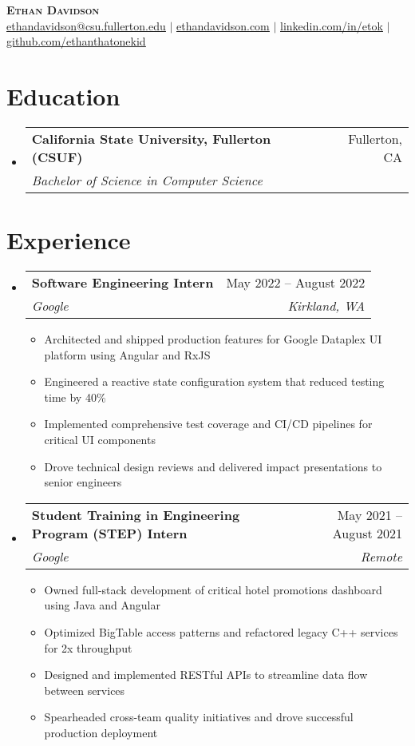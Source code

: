 \documentclass[letterpaper,12pt]{article}
\makeatletter
\newcommand{\resumeItem}[1]{
  \item\small{
    {#1 \vspace{-2pt}}
  }
}
\newcommand{\resumeSubheading}[4]{
  \vspace{-2pt}\item
    \begin{tabular*}{0.97\textwidth}[t]{l@{\extracolsep{\fill}}r}
      \textbf{#1} & #2 \\
      \textit{\small#3} & \textit{\small #4} \\
    \end{tabular*}\vspace{-7pt}
}
\newcommand{\resumeSubHeadingListStart}{\begin{itemize}[leftmargin=0.15in, label={}]}
\newcommand{\resumeSubHeadingListEnd}{\end{itemize}}
\newcommand{\resumeItemListStart}{\begin{itemize}}
\newcommand{\resumeItemListEnd}{\end{itemize}\vspace{-5pt}}
\makeatother
\begin{document}
\begin{center}
  \textbf{\Huge \scshape Ethan Davidson} \\ \vspace{1pt}
  \small \href{mailto:ethandavidson@csu.fullerton.edu}{\underline{ethandavidson@csu.fullerton.edu}} $|$ 
  \href{https://etok.me}{\underline{ethandavidson.com}} $|$
  \href{https://linkedin.com/in/etok}{\underline{linkedin.com/in/etok}} $|$
  \href{https://github.com/ethanthatonekid}{\underline{github.com/ethanthatonekid}}
\end{center}

\section{Education}
\resumeSubHeadingListStart
  \resumeSubheading
    {California State University, Fullerton (CSUF)}{Fullerton, CA}
    {Bachelor of Science in Computer Science}{}
\resumeSubHeadingListEnd

\section{Experience}
\resumeSubHeadingListStart
  \resumeSubheading
    {Software Engineering Intern}{May 2022 -- August 2022}
    {Google}{Kirkland, WA}
    \resumeItemListStart
      \resumeItem{Architected and shipped production features for Google Dataplex UI platform using Angular and RxJS}
      \resumeItem{Engineered a reactive state configuration system that reduced testing time by 40\%}
      \resumeItem{Implemented comprehensive test coverage and CI/CD pipelines for critical UI components}
      \resumeItem{Drove technical design reviews and delivered impact presentations to senior engineers}
    \resumeItemListEnd

  \resumeSubheading
    {Student Training in Engineering Program (STEP) Intern}{May 2021 -- August 2021}
    {Google}{Remote}
    \resumeItemListStart
      \resumeItem{Owned full-stack development of critical hotel promotions dashboard using Java and Angular}
      \resumeItem{Optimized BigTable access patterns and refactored legacy C++ services for 2x throughput}
      \resumeItem{Designed and implemented RESTful APIs to streamline data flow between services}
      \resumeItem{Spearheaded cross-team quality initiatives and drove successful production deployment}
    \resumeItemListEnd
\resumeSubHeadingListEnd
\end{document}
